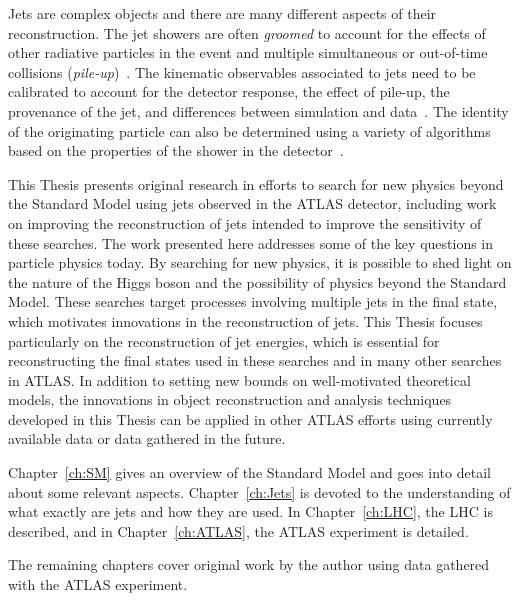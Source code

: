 Jets are complex objects and there are many different aspects of their reconstruction.
The jet showers are often \textit{groomed} to account for the effects of other radiative particles in the event and multiple simultaneous or out-of-time collisions (\textit{pile-up})~\cite{Soyez:2018opl,Aad:2013gja,Nachman:2014kla,Krohn:2009th,ATL-PHYS-PUB-2014-004,ATL-PHYS-PUB-2019-027}.
The kinematic observables associated to jets need to be calibrated to account for the detector response, the effect of pile-up, the provenance of the jet, and differences between simulation and data~\cite{PERF-2016-04,Aad:2011he,Aaboud:2018kfi,Cacciari:2007fd,Cacciari:2008gn,Aad:2015ina}.
The identity of the originating particle can also be determined using a variety of algorithms based on the properties of the shower in the detector~\cite{Larkoski:2017jix,Asquith:2018igt,ATL-PHYS-PUB-2017-009,Aad:2014gea,ATLAS-CONF-2016-034,ATL-PHYS-PUB-2017-017,Aaboud:2017pou,ATL-PHYS-PUB-2014-004,Aad:2015rpa,Aad:2016pux,Aaboud:2018psm,Aad:2019uoz}.

This Thesis presents original research in efforts to search for new physics beyond the Standard Model using jets observed in the ATLAS detector, including work on improving the reconstruction of jets intended to improve the sensitivity of these searches.
The work presented here addresses some of the key questions in particle physics today.
By searching for new physics, it is possible to shed light on the nature of the Higgs boson and the possibility of physics beyond the Standard Model. 
These searches target processes involving multiple jets in the final state, which motivates innovations in the reconstruction of jets.
This Thesis focuses particularly on the reconstruction of jet energies, which is essential for reconstructing the final states used in these searches and in many other searches in ATLAS.
In addition to setting new bounds on well-motivated theoretical models,
the innovations in object reconstruction and analysis techniques developed in this Thesis can be applied in other ATLAS efforts using currently available data or data gathered in the future.

Chapter~\ref{ch:SM} gives an overview of the Standard Model and goes into detail about some relevant aspects.
Chapter~\ref{ch:Jets} is devoted to the understanding of what exactly are jets and how they are used.
In Chapter~\ref{ch:LHC}, the LHC is described, and in Chapter~\ref{ch:ATLAS}, the ATLAS experiment is detailed.

The remaining chapters cover original work by the author using data gathered with the ATLAS experiment.

